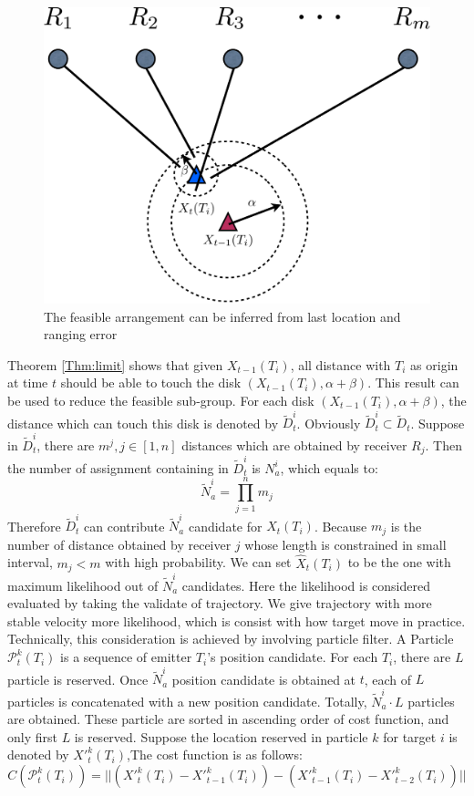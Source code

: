 \documentclass[conference]{IEEEtran}
\begin{document}
\begin{figure}[htpb]
    \begin{center}
	\includegraphics[width=.25\textwidth]{LimitToArrange}
    \end{center}
    \caption{The feasible arrangement can be inferred from last location and ranging
    error }
    \label{fig:LimitToArrange}
\end{figure} 

Theorem \ref{Thm:limit} shows that given $X_{t-1}(T_i)$, all distance with $T_i$ as
origin at time $t$ should be able to touch the disk $(X_{t-1}(T_i),\alpha+\beta)$. This
result can be used to reduce the feasible sub-group.  For each disk
$(X_{t-1}(T_i),\alpha+\beta)$, the distance which can touch  this disk is denoted by
$\tilde{D}_{t}^i$. Obviously $\tilde{D}_{t}^i\subset\tilde{D}_t$. Suppose in
$\tilde{D}_{t}^i$, there are $m^j,j\in[1,n]$ distances which are obtained by receiver
$R_j$. Then the number of assignment containing in $\tilde{D}_{t}^i$ is $N_a^i$, which equals
to: 
 \begin{equation}
     \tilde{N}_a^i=\prod_{j=1}^n m_j 
     \label{equ:nap}
 \end{equation}
Therefore $\tilde{D}_{t}^i$ can contribute $\tilde{N}_a^i$ candidate for $X_{t}(T_i)$.
Because $m_j$ is the number of distance obtained by receiver $j$ whose length is
constrained in small interval, $m_j<m$ with high probability.  We can set
$\hat{X}_{t}(T_i)$ to be the one with maximum likelihood out of $\tilde{N}_a^i$
candidates. Here the likelihood is considered evaluated by taking the validate of
trajectory. We give trajectory with more stable velocity more likelihood, which is
consist with how target move in practice. Technically, this consideration is achieved by
involving particle filter. A Particle $\mathcal{P}_t^k(T_i)$ is a sequence of emitter
$T_i$'s position candidate. For each $T_i$, there are $L$ particle is reserved. Once 
$\tilde{N}_a^i$ position candidate is obtained at $t$, each of $L$ particles is
concatenated with a new position candidate. Totally, $\tilde{N}_a^i\cdot L$ particles
are obtained. These particle are sorted in ascending order of cost function, and only
first $L$ is reserved. Suppose the location reserved in particle $k$ for target $i$ is
denoted by $X'^k_t(T_i)$,The cost function is as follows:
\begin{equation}
    C(\mathcal{P}_t^k(T_i))= ||(X'^k_{t}(T_i)-X'^k_{t-1}(T_i))-(X'^k_{t-1}(T_i)-X'^k_{t-2}(T_i))||
    \label{equ:cost1}
\end{equation}
\end{document}
